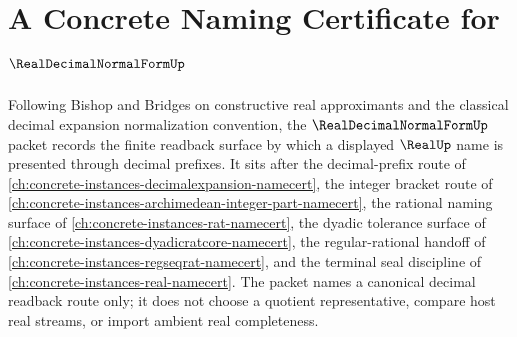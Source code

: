 \chapter{A Concrete Naming Certificate for $\RealDecimalNormalFormUp$}
\label{ch:concrete-instances-real-decimal-normal-form-namecert}

Following Bishop and Bridges on constructive real approximants and the
classical decimal expansion normalization convention, the
$\RealDecimalNormalFormUp$ packet records the finite readback surface by which
a displayed $\RealUp$ name is presented through decimal prefixes. It sits
after the decimal-prefix route of
\autoref{ch:concrete-instances-decimalexpansion-namecert}, the integer
bracket route of
\autoref{ch:concrete-instances-archimedean-integer-part-namecert}, the
rational naming surface of \autoref{ch:concrete-instances-rat-namecert}, the
dyadic tolerance surface of
\autoref{ch:concrete-instances-dyadicratcore-namecert}, the regular-rational
handoff of \autoref{ch:concrete-instances-regseqrat-namecert}, and the
terminal seal discipline of \autoref{ch:concrete-instances-real-namecert}.
The packet names a canonical decimal readback route only; it does not choose
a quotient representative, compare host real streams, or import ambient
real completeness.

